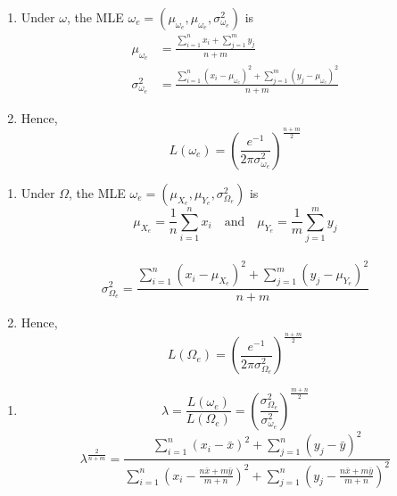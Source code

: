\begin{frame}
	\begin{enumerate}
		\item[] Under $\omega$, the MLE $\omega_e=(\mu_{\omega_e},\mu_{\omega_e},\sigma_{\omega_e}^2)$ is\\[1em]
\begin{align*}
	\mu_{\omega_e} &=  \frac{\sum_{i=1}^n x_i+\sum_{j=1}^m y_j}{n+m}\\[2em]
	\sigma_{\omega_e}^2 &=   \frac{\sum_{i=1}^n (x_i-\mu_{\omega_e})^2+\sum_{j=1}^m (y_j-\mu_{\omega_e})^2}{n+m}
\end{align*}
\vfill
\item[] Hence,
	\[
		L(\omega_e) = \left(  \frac{e^{-1}}{2\pi\sigma_{\omega_e}^2}\right)^{ \frac{n+m}{2}}
	\]
	\end{enumerate}
\end{frame}
\begin{frame}

	\begin{enumerate}
		\item[] Under $\Omega$, the MLE $\omega_e=(\mu_{X_e},\mu_{Y_e},\sigma_{\Omega_e}^2)$ is\\[1em]
			\[
				\mu_{X_e} =\frac{1}{n} \sum_{i=1}^{n}x_i \quad\text{and}\quad \mu_{Y_e}=\frac{1}{m} \sum_{j=1}^{m}y_j
			\]
			\\[1em]
			\[
				\sigma_{\Omega_e}^2 =
	 \frac{\sum_{i=1}^n (x_i-\mu_{X_e})^2+\sum_{j=1}^m (y_j-\mu_{Y_e})^2}{n+m}
			\]
			\vfill
		\item[] Hence,
			\[
				L(\Omega_e)
		= \left(  \frac{e^{-1}}{2\pi\sigma_{\Omega_e}^2}\right)^{ \frac{n+m}{2}}
			\]
	\end{enumerate}
\end{frame}
\begin{frame}

	\begin{enumerate}
		\item[]
			\[
				\lambda =  \frac{L(\omega_e)}{L(\Omega_e)}= \left(  \frac{\sigma^2_{\Omega_e}}{\sigma^2_{\omega_e}}\right)^{ \frac{m+n}{2}}
			\]
			\vfill
\[
\lambda^{ \frac{2}{n+m}} =  \frac{\sum_{i=1}^n (x_i-\bar{x})^2+\sum_{j=1}^n (y_j-\bar{y})^2}{\sum_{i=1}^n \left(x_i- \frac{n\bar{x}+m\bar{y}}{m+n}\right)^2+\sum_{j=1}^n \left(y_j-\frac{n\bar{x}+m\bar{y}}{m+n}\right)^2}
\]
	\end{enumerate}
\end{frame}
